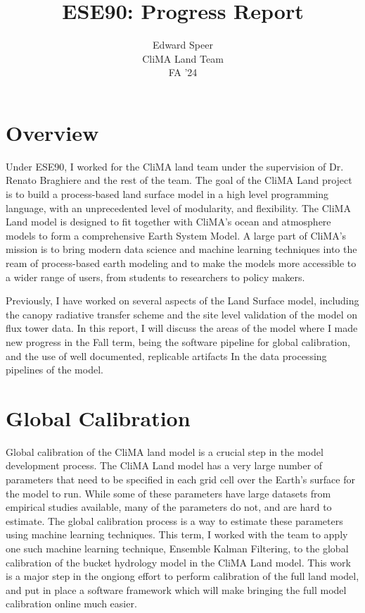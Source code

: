 \documentclass[11pt, a4paper]{article}
\title{ESE90: Progress Report}
\author{%
  Edward Speer
  \\
  CliMA Land Team\\
  FA '24 \\
}
\begin{document}
\maketitle

\section{Overview}

Under ESE90, I worked for the CliMA land team under the supervision of
Dr. Renato Braghiere and the rest of the team. The goal of the CliMA Land
project is to build a process-based land surface model in a high level
programming language, with an unprecedented level of modularity, and
flexibility. The CliMA Land model is designed to fit together with CliMA's ocean
and atmosphere models to form a comprehensive Earth System Model. A large part
of CliMA's mission is to bring modern data science and machine learning
techniques into the ream of process-based earth modeling and to make the models
more accessible to a wider range of users, from students to researchers to
policy makers.

Previously, I have worked on several aspects of the Land Surface model,
including the canopy radiative transfer scheme and the site level validation of
the model on flux tower data. In this report, I will discuss the areas of the
model where I made new progress in the Fall term, being the software pipeline
for global calibration, and the use of well documented, replicable artifacts In
the data processing pipelines of the model.

\section{Global Calibration}

Global calibration of the CliMA land model is a crucial step in the model
development process. The CliMA Land model has a very large number of parameters
that need to be specified in each grid cell over the Earth's surface for the
model to run. While some of these parameters have large datasets from empirical
studies available, many of the parameters do not, and are hard to estimate. The
global calibration process is a way to estimate these parameters using machine
learning techniques. This term, I worked with the team to apply one such machine
learning technique, Ensemble Kalman Filtering, to the global calibration of the
bucket hydrology model in the CliMA Land model. This work is a major step in the
ongiong effort to perform calibration of the full land model, and put in place a
software framework which will make bringing the full model calibration online
much easier.
\end{document}
